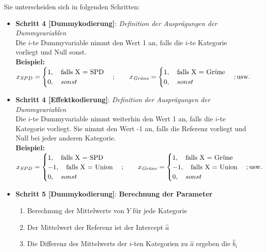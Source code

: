\documentclass[a4paper]{article}
\begin{document}
\noindent Sie unterscheiden sich in folgenden Schritten:
\begin{itemize}
    \item[] \textbf{Schritt 4 [Dummykodierung]}: \textit{Definition der Ausprägungen der Dummyvariablen}\\
            Die $i$-te Dummyvariable nimmt den Wert 1 an, falls die $i$-te Kategorie vorliegt und Null sonst.\\
            \textbf{Beispiel:} $x_{SPD} = \begin{cases} 1,\quad \mbox{falls X = SPD}\\ 0,\quad sonst\end{cases};\qquad x_{\mbox{\it \scriptsize Grüne}} = \begin{cases} 1,\quad \mbox{falls X = Grüne}\\ 0,\quad sonst\end{cases}; \mbox{usw.}$
\clearpage
    \item[] \textbf{Schritt 4 [Effektkodierung]}: \textit{Definition der Ausprägungen der Dummyvariablen}\\
            Die $i$-te Dummyvariable nimmt weiterhin den Wert 1 an, falls die $i$-te Kategorie vorliegt. Sie nimmt den Wert -1 an, falls die Referenz vorliegt und Null bei jeder anderen Kategorie.\\
            \textbf{Beispiel:} $x_{SPD} = \begin{cases} 1,\quad \mbox{falls X = SPD}\\-1,\quad \mbox{falls X = Union}\\ 0,\quad sonst\end{cases};\qquad x_{\mbox{\it \scriptsize Grüne}} = \begin{cases} 1,\quad \mbox{falls X = Grüne}\\-1,\quad \mbox{falls X = Union}\\ 0,\quad sonst\end{cases}; \mbox{usw.}$
    \item[] \textbf{Schritt 5 [Dummykodierung]}: \textbf{Berechnung der Parameter}
            \begin{enumerate}
                \item Berechnung der Mittelwerte von $Y$ für jede Kategorie
                \item Der Mittelwert der Referenz ist der Intercept $\hat a$
                \item Die Differenz des Mittelwerts der $i$-ten Kategorien zu $\hat a$ ergeben die $\hat b_i$
            \end{enumerate}

\end{itemize}
\end{document}
